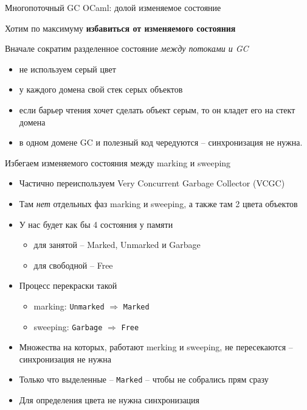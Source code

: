 \documentclass[aspectratio=169
  , xcolor={svgnames} 
  , hyperref={ colorlinks,citecolor=DeepPink4
             , linkcolor=DarkRed,urlcolor=DarkBlue}
  , russian
  ]{beamer}
\theoremstyle{exerciseStyle1}
\renewcommand{\cite}[1]{}
\begin{document}
\begin{frame}{Многопоточный GC OCaml: долой изменяемое состояние}

Хотим по максимуму \textbf{избавиться от изменяемого состояния}
\vspace{1cm}

Вначале сократим разделенное состояние \textit{между потоками и GC}
\begin{itemize}
  \item не используем серый цвет
  \item у каждого домена свой стек серых объектов
  \item если барьер чтения хочет сделать объект серым, то он кладет его на стект домена
  \item в одном домене GC и полезный код чередуются -- синхронизация не нужна.
\end{itemize}
\end{frame}

\begin{frame}{Избегаем изменяемого состояния между marking и sweeping}
\begin{itemize}
  \item Частично переиспользуем Very Concurrent Garbage  Collector (VCGC)\cite{VCGC}
  \item Там \textit{нет} отдельных фаз  marking и sweeping, а также там 2 цвета объектов
  \item У нас будет как бы  4 состояния у памяти
  \begin{itemize}
  \item для занятой -- Marked, Unmarked и Garbage
  \item для свободной -- Free
  \end{itemize}
  \item Процесс перекраски такой
\begin{itemize}
  \item marking:  \texttt{Unmarked}  $\Rightarrow$ \texttt{Marked}
  \item sweeping:  \texttt{Garbage} $\Rightarrow$ \texttt{Free} 
\end{itemize}
\item Множества на которых, работают merking и sweeping, не пересекаются -- синхронизация не нужна
\item Только что выделенные -- \texttt{Marked} -- чтобы не собрались прям сразу
\item Для определения цвета не нужна синхронизация
  \end{itemize}
\end{frame}
\end{document}
